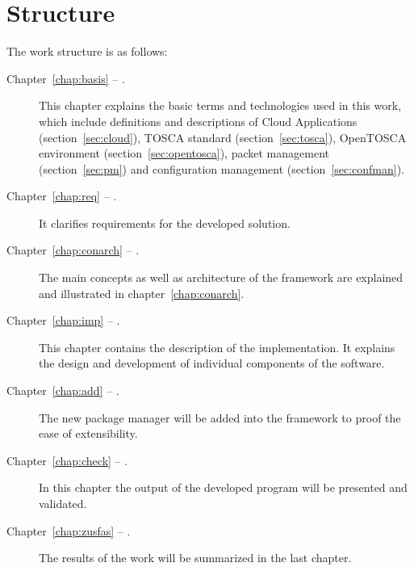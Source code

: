 \section*{Structure}
The work structure is as follows:
\begin{description}
\item[Chapter~\ref{chap:basis} -- .] This chapter explains the basic terms and technologies used in this work, which include definitions and descriptions of Cloud Applications (section~\ref{sec:cloud}), TOSCA standard (section~\ref{sec:tosca}), OpenTOSCA environment  (section~\ref{sec:opentosca}), packet management (section~\ref{sec:pm}) and configuration management (section~\ref{sec:confman}).
\item[Chapter~\ref{chap:req} -- .] It clarifies requirements for the developed solution.
\item[Chapter~\ref{chap:conarch} -- .] The main concepts as well as architecture of the framework are explained and illustrated in chapter~\ref{chap:conarch}.
\item[Chapter~\ref{chap:imp} -- .] This chapter contains the description of the implementation.
 It explains the design and development of individual components of the software. 
\item[Chapter~\ref{chap:add} -- .] The new package manager will be added into the framework to proof the ease of extensibility. 
\item[Chapter~\ref{chap:check} -- .] In this chapter the output of the developed program will be presented and validated.
\item[Chapter~\ref{chap:zusfas} -- .] The results of the work will be summarized in the last chapter.
\end{description}
